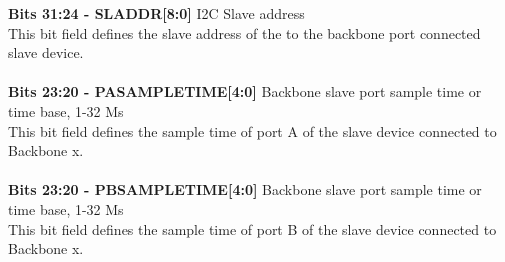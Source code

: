 \documentclass{article}
\begin{document}
\textbf{Bits 31:24 - SLADDR[8:0]} I2C Slave address\\
This bit field defines the slave address of the to the backbone port connected slave device.\\\\
\textbf{Bits 23:20 - PASAMPLETIME[4:0]} Backbone slave port sample time or time base, 1-32 Ms\\
This bit field defines the sample time of port A of the slave device connected to Backbone x.\\\\
\textbf{Bits 23:20 - PBSAMPLETIME[4:0]} Backbone slave port sample time or time base, 1-32 Ms\\
This bit field defines the sample time of port B of the slave device connected to Backbone x.\\\\
\end{document}
